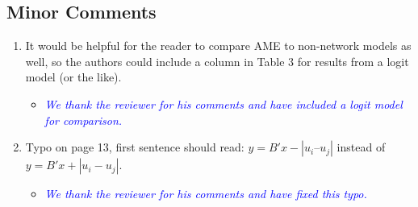 \subsection{Minor Comments}

\begin{enumerate}
	\item It would be helpful for the reader to compare AME to non-network models as well, so the authors could include a column in Table 3 for results from a logit model (or the like). 
	\begin{itemize}
		\item \textcolor{blue}{ \emph{
		We thank the reviewer for his comments and have included a logit model for comparison.
		}}
	\end{itemize}		
	\item Typo on page 13, first sentence should read: $y = B'x - |u_i – u_j|$ instead of $y = B'x + |u_i - u_j|$.
	\begin{itemize}
		\item \textcolor{blue}{ \emph{
		We thank the reviewer for his comments and have fixed this typo.
		}}
	\end{itemize}		
\end{enumerate}

